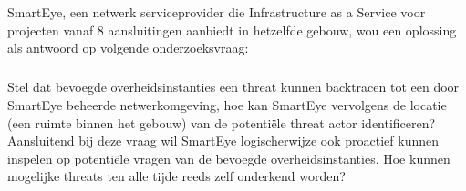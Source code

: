 
%
%
%
%
%

%



\chapter*{}
SmartEye, een netwerk serviceprovider die Infrastructure as a Service voor projecten vanaf 8 aansluitingen aanbiedt in hetzelfde gebouw, wou een oplossing als antwoord op volgende onderzoeksvraag:
\paragraph{}
Stel dat bevoegde overheidsinstanties een threat kunnen backtracen tot een door SmartEye beheerde netwerkomgeving, hoe kan SmartEye vervolgens de locatie (een ruimte binnen het gebouw) van de potentiële threat actor identificeren? Aansluitend bij deze vraag wil SmartEye logischerwijze ook proactief kunnen inspelen op potentiële vragen van de bevoegde overheidsinstanties. Hoe kunnen mogelijke threats ten alle tijde reeds zelf onderkend worden?
